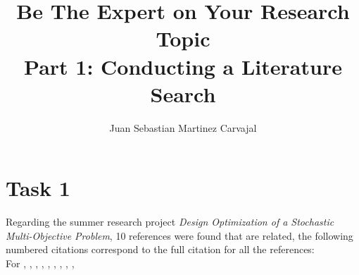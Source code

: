 \documentclass{journal}
\title{\textbf{Be The Expert on Your Research Topic}\\Part 1: Conducting a Literature Search}
\author{Juan Sebastian Martinez Carvajal}
\date{}
\begin{document}
\maketitle
\hrulefill

\section{Task 1}
Regarding the summer research project \textit{Design Optimization of a Stochastic Multi-Objective Problem}, 10 references were found that are related, the following numbered citations correspond to the full citation for all the references:\\





For \cite{Seeger2004}, \cite{Constantine2014}, \cite{Bilionis2016}, \cite{Costa2006}, \cite{Davidson-Pilon2014}, \cite{Li2014}, \cite{Guo2007}, \cite{Schaul2011}, \cite{Wang2016}, \cite{Pandita2016}
\end{document}
